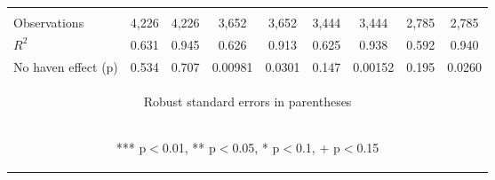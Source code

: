 \begin{center}
\begin{tabular}{lcccccccc}
\vspace{4pt} & \begin{footnotesize}\end{footnotesize} & \begin{footnotesize}\end{footnotesize} & \begin{footnotesize}\end{footnotesize} & \begin{footnotesize}\end{footnotesize} & \begin{footnotesize}\end{footnotesize} & \begin{footnotesize}\end{footnotesize} & \begin{footnotesize}\end{footnotesize} & \begin{footnotesize}\end{footnotesize} \\
Observations & 4,226 & 4,226 & 3,652 & 3,652 & 3,444 & 3,444 & 2,785 & 2,785 \\
$R^2$ & 0.631 & 0.945 & 0.626 & 0.913 & 0.625 & 0.938 & 0.592 & 0.940 \\
 No haven effect (p) & 0.534 & 0.707 & 0.00981 & 0.0301 & 0.147 & 0.00152 & 0.195 & 0.0260 \\ \hline
\multicolumn{9}{c}{\begin{footnotesize} Robust standard errors in parentheses\end{footnotesize}} \\
\multicolumn{9}{c}{\begin{footnotesize} *** p$<$0.01, ** p$<$0.05, * p$<$0.1, + p$<$0.15\end{footnotesize}} \\
\end{tabular}
\end{center}
